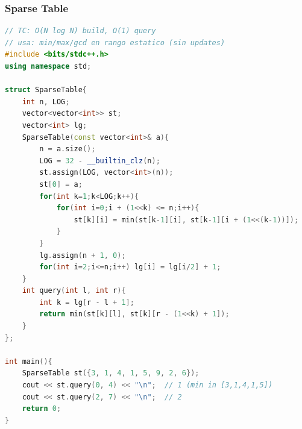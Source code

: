 \subsubsection{Sparse Table}
\begin{lstlisting}[style=mystyle, language=C++]
// TC: O(N log N) build, O(1) query
// usa: min/max/gcd en rango estatico (sin updates)
#include <bits/stdc++.h>
using namespace std;

struct SparseTable{
	int n, LOG;
	vector<vector<int>> st;
	vector<int> lg;
	SparseTable(const vector<int>& a){
		n = a.size();
		LOG = 32 - __builtin_clz(n);
		st.assign(LOG, vector<int>(n));
		st[0] = a;
		for(int k=1;k<LOG;k++){
			for(int i=0;i + (1<<k) <= n;i++){
				st[k][i] = min(st[k-1][i], st[k-1][i + (1<<(k-1))]);
			}
		}
		lg.assign(n + 1, 0);
		for(int i=2;i<=n;i++) lg[i] = lg[i/2] + 1;
	}
	int query(int l, int r){
		int k = lg[r - l + 1];
		return min(st[k][l], st[k][r - (1<<k) + 1]);
	}
};

int main(){
	SparseTable st({3, 1, 4, 1, 5, 9, 2, 6});
	cout << st.query(0, 4) << "\n";  // 1 (min in [3,1,4,1,5])
	cout << st.query(2, 7) << "\n";  // 2
	return 0;
}
\end{lstlisting}
